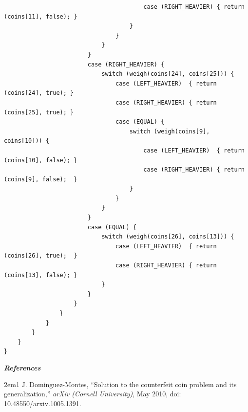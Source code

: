 \documentclass[answers]{exam}
\begin{document}
\begin{questions}
\begin{parts}
\begin{solution}
\begin{small}
\begin{verbatim}
                                        case (RIGHT_HEAVIER) { return (coins[11], false); }
                                    }
                                }
                            }
                        }
                        case (RIGHT_HEAVIER) {
                            switch (weigh(coins[24], coins[25])) {
                                case (LEFT_HEAVIER)  { return (coins[24], true); }
                                case (RIGHT_HEAVIER) { return (coins[25], true); }
                                case (EQUAL) {
                                    switch (weigh(coins[9], coins[10])) {
                                        case (LEFT_HEAVIER)  { return (coins[10], false); }
                                        case (RIGHT_HEAVIER) { return (coins[9], false);  }
                                    }
                                }
                            }
                        }
                        case (EQUAL) {
                            switch (weigh(coins[26], coins[13])) {
                                case (LEFT_HEAVIER)  { return (coins[26], true);  }
                                case (RIGHT_HEAVIER) { return (coins[13], false); }
                            }
                        }
                    }
                }
            }
        }
    }
}
\end{verbatim}\end{small}

            \textbf{\itshape References}

            \begin{hangparas}{2em}{1}
            J. Dominguez-Montes, ``Solution to the counterfeit coin problem and its generalization,'' \textit{arXiv (Cornell University)}, May 2010, doi: 10.48550/arxiv.1005.1391.
            \end{hangparas}
        \end{solution}

    \end{parts}

    \question[5] \phantom{.}
\end{questions}
\end{document}
